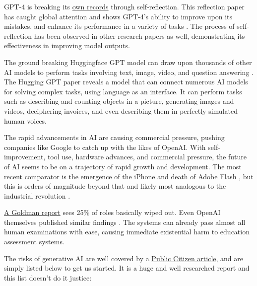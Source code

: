 GPT-4 is breaking its \href{https://nanothoughts.substack.com/p/reflecting-on-reflexion}{own records} through self-reflection. This reflection paper has caught global attention and shows GPT-4's ability to improve upon its mistakes, and enhance its performance in a variety of tasks \cite{shinn2023reflexion}. The process of self-reflection has been observed in other research papers as well, demonstrating its effectiveness in improving model outputs.\par
The ground breaking Huggingface GPT model can draw upon thousands of other AI models to perform tasks involving text, image, video, and question answering \cite{shen2023hugginggpt}. The Hugging GPT paper reveals a model that can connect numerous AI models for solving complex tasks, using language as an interface. It can perform tasks such as describing and counting objects in a picture, generating images and videos, deciphering invoices, and even describing them in perfectly simulated human voices.\par
The rapid advancements in AI are causing commercial pressure, pushing companies like Google to catch up with the likes of OpenAI. With self-improvement, tool use, hardware advances, and commercial pressure, the future of AI seems to be on a trajectory of rapid growth and development. The most recent comparator is the emergence of the iPhone and death of Adobe Flash \cite{horton2019death}, but this is orders of magnitude beyond that and likely most analogous to the industrial revolution \cite{trajtenberg2018ai}. \par 
\href{https://www.key4biz.it/wp-content/uploads/2023/03/Global-Economics-Analyst_-The-Potentially-Large-Effects-of-Artificial-Intelligence-on-Economic-Growth-Briggs_Kodnani.pdf}{A Goldman report} sees 25\% of roles basically wiped out. Even OpenAI themselves published similar findings \cite{eloundou2023gpts}. The systems can already pass almost all human examinations with ease, causing immediate existential harm to education assessment systems.\par 
The risks of generative AI are well covered by a \href{https://www.citizen.org/article/sorry-in-advance-generative-ai-artificial-intellligence-chatgpt-report/}{Public Citizen article}, and are simply listed below to get us started. It is a huge and well researched report and this list doesn't do it justice:

